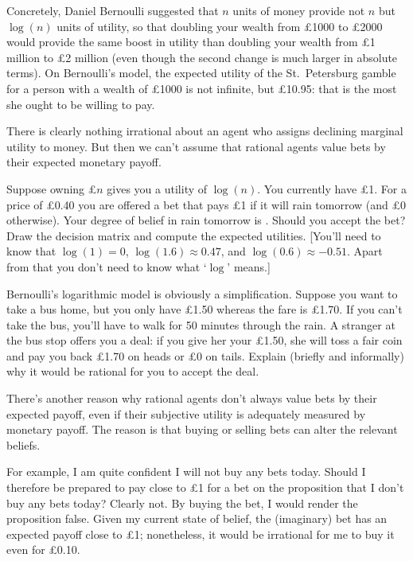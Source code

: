 Concretely, Daniel Bernoulli suggested that $n$ units of money provide
not $n$ but $\log(n)$ units of utility, so that doubling your wealth
from £1000 to £2000 would provide the same boost in utility than
doubling your wealth from £1 million to £2 million (even though the
second change is much larger in absolute terms). On Bernoulli's model,
the expected utility of the St.\ Petersburg gamble for a person with a
wealth of £1000 is not infinite, but £10.95: that is the most she
ought to be willing to pay.

There is clearly nothing irrational about an agent who assigns
declining marginal utility to money. But then we can't assume that
rational agents value bets by their expected monetary payoff.

\begin{exercise2}
  Suppose owning £$n$ gives you a utility of $\log(n)$. You currently
  have £1. For a price of £0.40 you are offered a bet that pays £1 if
  it will rain tomorrow (and £0 otherwise). Your degree of belief in
  rain tomorrow is . Should you accept the bet?  Draw
  the decision matrix and compute the expected utilities. [You'll need
  to know that $\log(1) = 0$, $\log(1.6) \approx 0.47$, and $\log(0.6)
  \approx -0.51$. Apart from that you don't need to know what `$\log$'
  means.] 
\end{exercise2}

\begin{exercise1}
  Bernoulli's logarithmic model is obviously a simplification. Suppose
  you want to take a bus home, but you only have £1.50 whereas the
  fare is £1.70. If you can't take the bus, you'll have to walk for 50
  minutes through the rain. A stranger at the bus stop offers you a
  deal: if you give her your £1.50, she will toss a fair coin and pay
  you back £1.70 on heads or £0 on tails. Explain (briefly and
  informally) why it would be rational for you to accept the deal.
\end{exercise1}

There's another reason why rational agents don't always value bets by
their expected payoff, even if their subjective utility is adequately
measured by monetary payoff. The reason is that buying or selling bets
can alter the relevant beliefs. 

For example, I am quite confident I will not buy any bets
today. Should I therefore be prepared to pay close to £1 for a bet on
the proposition that I don't buy any bets today? Clearly not. By
buying the bet, I would render the proposition false. Given my current
state of belief, the (imaginary) bet has an expected payoff close to
£1; nonetheless, it would be irrational for me to buy it even for £0.10.

